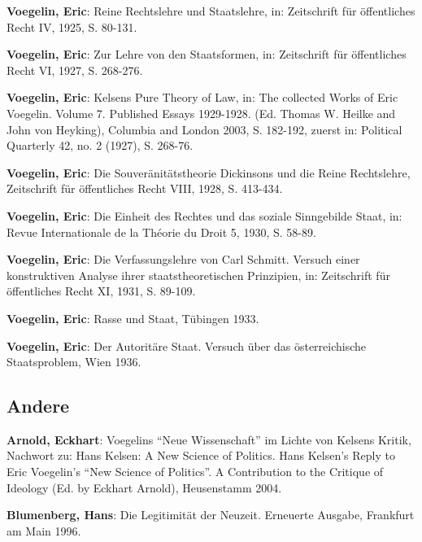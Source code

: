 \documentclass[12pt,a4paper,ngerman]{article}
\begin{document}
\setlength{\parindent}{0ex}

\setlength{\parskip}{3ex}

{\bf Voegelin, Eric}: Reine Rechtslehre und Staatslehre, in: Zeitschrift für
öffentliches Recht IV, 1925, S. 80-131.

{\bf Voegelin, Eric}: Zur Lehre von den Staatsformen, in: Zeitschrift für
öffentliches Recht VI, 1927, S. 268-276.

{\bf Voegelin, Eric}: Kelsens Pure Theory of Law, in: The collected
Works of Eric Voegelin. Volume 7.  Published Essays 1929-1928. (Ed.
Thomas W. Heilke and John von Heyking), Columbia and London 2003, S.
182-192, zuerst in: Political Quarterly 42, no. 2 (1927), S. 268-76.

{\bf Voegelin, Eric}: Die Souveränitätstheorie Dickinsons und die Reine
Rechtslehre, Zeitschrift für öffentliches Recht VIII, 1928, S. 413-434.

{\bf Voegelin, Eric}: Die Einheit des Rechtes und das soziale
Sinngebilde Staat, in: Revue Internationale de la Théorie du Droit 5,
1930, S. 58-89.

{\bf Voegelin, Eric}: Die Verfassungslehre von Carl Schmitt. Versuch einer
konstruktiven Analyse ihrer staatstheoretischen Prinzipien, in: Zeitschrift
für öffentliches Recht XI, 1931, S. 89-109.

{\bf Voegelin, Eric}: Rasse und Staat, Tübingen 1933.

{\bf Voegelin, Eric}: Der Autoritäre Staat. Versuch über das österreichische
Staatsproblem, Wien 1936.


\subsection{Andere}

\setlength{\parindent}{0ex}

\setlength{\parskip}{3ex}

{\bf Arnold, Eckhart}: Voegelins "`Neue Wissenschaft"' im Lichte von Kelsens
Kritik, Nachwort zu: Hans Kelsen: A New Science of Politics. Hans Kelsen's
Reply to Eric Voegelin's "`New Science of Politics"'. A Contribution to the
Critique of Ideology (Ed. by Eckhart Arnold), Heusenstamm 2004.


{\bf Blumenberg, Hans}: Die Legitimität der Neuzeit. Erneuerte Ausgabe,
Frankfurt am Main 1996.
\end{document}
